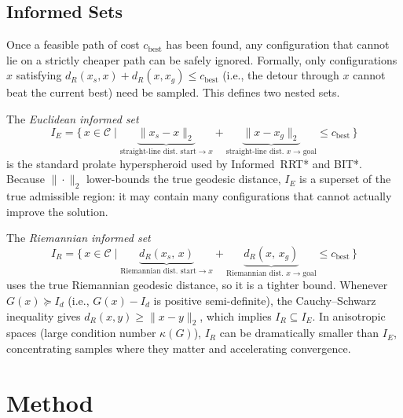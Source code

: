 \documentclass[journal]{IEEEtran}
\newcommand{\Cspace}{\mathcal{C}}
\newcommand{\IR}{I_{\!R}}
\newcommand{\IE}{I_{\!E}}
\newcommand{\dR}{d_{\!R}}
\begin{document}
\subsection*{Informed Sets}

Once a feasible path of cost $c_{\mathrm{best}}$ has been found, any
configuration that cannot lie on a strictly cheaper path can be safely
ignored.
Formally, only configurations $x$ satisfying
$\dR(x_s,x) + \dR(x,x_g) \le c_{\mathrm{best}}$
(i.e., the detour through $x$ cannot beat the current best) need be sampled.
This defines two nested sets.

The \emph{Euclidean informed set}
\begin{equation}\label{eq:IE}
  \IE
  = \bigl\{\, x \in \Cspace
      \;\big|\;
      \underbrace{\|x_s - x\|_2}_{\text{straight-line dist.\ start}\to x}
    + \underbrace{\|x - x_g\|_2}_{\text{straight-line dist.\ }x\to\text{goal}}
    \le c_{\mathrm{best}} \,\bigr\}
\end{equation}
is the standard prolate hyperspheroid used by Informed~RRT* and BIT*.
Because $\|\cdot\|_2$ lower-bounds the true geodesic distance, $\IE$
is a superset of the true admissible region: it may contain many
configurations that cannot actually improve the solution.

The \emph{Riemannian informed set}
\begin{equation}\label{eq:IR}
  \IR
  = \bigl\{\, x \in \Cspace
      \;\big|\;
      \underbrace{\dR(x_s,\, x)}_{\text{Riemannian dist.\ start}\to x}
    + \underbrace{\dR(x,\, x_g)}_{\text{Riemannian dist.\ }x\to\text{goal}}
    \le c_{\mathrm{best}} \,\bigr\}
\end{equation}
uses the true Riemannian geodesic distance, so it is a tighter bound.
Whenever $G(x) \succeq I_d$ (i.e., $G(x) - I_d$ is positive semi-definite),
the Cauchy–Schwarz inequality gives $\dR(x,y) \ge \|x - y\|_2$, which
implies $\IR \subseteq \IE$.
In anisotropic spaces (large condition number $\kappa(G)$), $\IR$ can
be dramatically smaller than $\IE$, concentrating samples where they
matter and accelerating convergence.


\section{Method}\label{sec:method}

\end{document}

